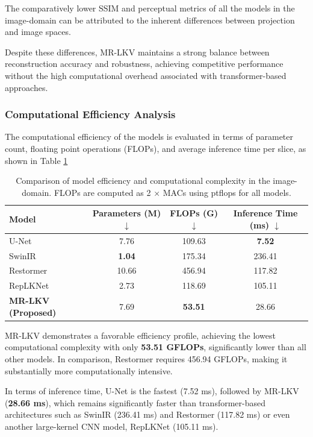 The comparatively lower SSIM and perceptual metrics of all the models in the image-domain can be attributed to the inherent differences between projection and image spaces.

Despite these differences, MR-LKV maintains a strong balance between reconstruction accuracy and robustness, achieving competitive performance without the high computational overhead associated with transformer-based approaches.

 

\subsubsection{Computational Efficiency Analysis}

The computational efficiency of the models is evaluated in terms of parameter count, floating point operations (FLOPs), and average inference time per slice, as shown in Table \ref{tab:efficiency_comparison_image}

\begin{table}[H]
\centering
\caption{Comparison of model efficiency and computational complexity in the image-domain. FLOPs are computed as 2 × MACs using ptflops for all models.}
\label{tab:efficiency_comparison_image}
\begin{tabular}{lccc}
\toprule
\rowcolor{gray!20}
Model & Parameters (M) $\downarrow$ & FLOPs (G) $\downarrow$ & Inference Time (ms) $\downarrow$ \\
\midrule
U-Net &  7.76&  109.63&  \textbf{7.52}\\
SwinIR &  \textbf{1.04}&  175.34&  236.41\\
Restormer &  10.66&   456.94&  117.82\\
RepLKNet &  2.73&  118.69&  105.11\\
\rowcolor{green!10} 
\textbf{MR-LKV (Proposed)} &  7.69&  \textbf{53.51}&  28.66\\
\bottomrule
\end{tabular}
\end{table}

MR-LKV demonstrates a favorable efficiency profile, achieving the lowest computational complexity with only \textbf{53.51 GFLOPs}, significantly lower than all other models. In comparison, Restormer requires 456.94 GFLOPs, making it substantially more computationally intensive.

In terms of inference time, U-Net is the fastest (7.52 ms), followed by MR-LKV (\textbf{28.66 ms}), which remains significantly faster than transformer-based architectures such as SwinIR (236.41 ms) and Restormer (117.82 ms) or even another large-kernel CNN model, RepLKNet (105.11 ms).

